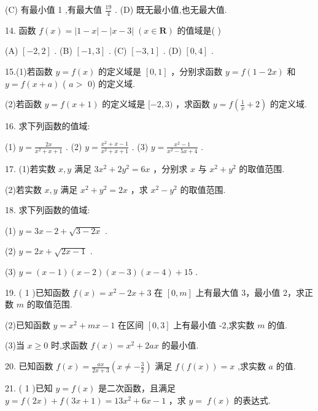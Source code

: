 \documentclass[10pt]{article}
\begin{document}
(C) 有最小值 1 ,有最大值 \(\frac{19}{4}\) . (D) 既无最小值,也无最大值.

14. 函数 \(f\left( x\right)  = \left| {1 - x}\right|  - \left| {x - 3}\right| \;\left( {x \in  \mathbf{R}}\right)\) 的值域是( )

(A) \(\left\lbrack  {-2,2}\right\rbrack\) . (B) \(\left\lbrack  {-1,3}\right\rbrack\) . (C) \(\left\lbrack  {-3,1}\right\rbrack\) . (D) \(\left\lbrack  {0,4}\right\rbrack\) .

15.(1)若函数 \(y = f\left( x\right)\) 的定义域是 \(\left\lbrack  {0,1}\right\rbrack\) ，分别求函数 \(y = f\left( {1 - {2x}}\right)\) 和 \(y = f\left( {x + a}\right)\) ( \(a >\) 0) 的定义域.

(2)若函数 \(y = f\left( {x + 1}\right)\) 的定义域是 \(\lbrack  - 2,3)\) ，求函数 \(y = f\left( {\frac{1}{x} + 2}\right)\) 的定义域.

16. 求下列函数的值域:

(1) \(y = \frac{2x}{{x}^{2} + x + 1}\) . (2) \(y = \frac{{x}^{2} + x - 1}{{x}^{2} + x + 1}\) . (3) \(y = \frac{{x}^{2} - 1}{{x}^{2} - {5x} + 4}\) .

17. (1)若实数 \(x,y\) 满足 \(3{x}^{2} + 2{y}^{2} = {6x}\) ，分别求 \(x\) 与 \({x}^{2} + {y}^{2}\) 的取值范围.

(2)若实数 \(x,y\) 满足 \({x}^{2} + {y}^{2} = {2x}\) ，求 \({x}^{2} - {y}^{2}\) 的取值范围.

18. 求下列函数的值域:

(1) \(y = {3x} - 2 + \sqrt{3 - {2x}}\) .

(2) \(y = {2x} + \sqrt{{2x} - 1}\) .

(3) \(y = \left( {x - 1}\right) \left( {x - 2}\right) \left( {x - 3}\right) \left( {x - 4}\right)  + {15}\) .

19. ( 1 )已知函数 \(f\left( x\right)  = {x}^{2} - {2x} + 3\) 在 \(\left\lbrack  {0,m}\right\rbrack\) 上有最大值 3，最小值 2，求正数 \(m\) 的取值范围.

(2)已知函数 \(y = {x}^{2} + {mx} - 1\) 在区间 \(\left\lbrack  {0,3}\right\rbrack\) 上有最小值 -2,求实数 \(m\) 的值.

(3)当 \(x \geq  0\) 时,求函数 \(f\left( x\right)  = {x}^{2} + {2ax}\) 的最小值.

20. 已知函数 \(f\left( x\right)  = \frac{ax}{{2x} + 3}\left( {x \neq   - \frac{3}{2}}\right)\) 满足 \(f\left( {f\left( x\right) }\right)  = x\) ,求实数 \(a\) 的值.

21. ( 1 )已知 \(y = f\left( x\right)\) 是二次函数，且满足 \(y = f\left( {2x}\right)  + f\left( {{3x} + 1}\right)  = {13}{x}^{2} + {6x} - 1\) ，求 \(y = \; f\left( x\right)\) 的表达式.
\end{document}

